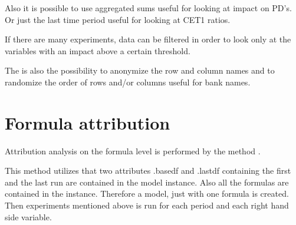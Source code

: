 \documentclass[letterpaper,10pt,english]{jupyterBook}
\begin{document}
\sphinxAtStartPar
Also it is possible to use aggregated sums \sphinxhyphen{} useful for looking at impact on PD’s. Or just the last time period \sphinxhyphen{} useful for looking at CET1 ratios.

\sphinxAtStartPar
If there are many experiments, data can be filtered in order to look only at the variables with an impact above a certain threshold.

\sphinxAtStartPar
The is also the possibility to   anonymize  the row and column names and to randomize
the order of rows and/or columns \sphinxhyphen{} useful for bank names.


\section{Formula attribution}
\label{\detokenize{content/howto/attribution/Attribution background:formula-attribution}}
\sphinxAtStartPar
Attribution analysis on the formula level is performed by the method .

\sphinxAtStartPar
This method utilizes that two attributes .basedf and .lastdf containing the first and the last run are contained in the model instance. Also all the formulas are contained in the instance. Therefore a model, just with one formula \sphinxhyphen{} is created. Then experiments mentioned above is run for each period and each right hand side variable.
\end{document}
